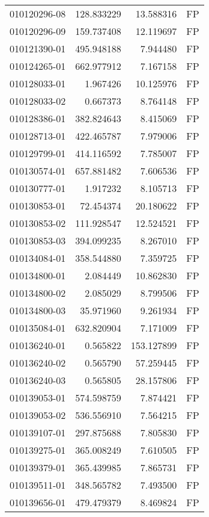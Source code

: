 \begin{tabular}{lrrl}
010120296-08 &  128.833229 &    13.588316 &   FP \\
010120296-09 &  159.737408 &    12.119697 &   FP \\
010121390-01 &  495.948188 &     7.944480 &   FP \\
010124265-01 &  662.977912 &     7.167158 &   FP \\
010128033-01 &    1.967426 &    10.125976 &   FP \\
010128033-02 &    0.667373 &     8.764148 &   FP \\
010128386-01 &  382.824643 &     8.415069 &   FP \\
010128713-01 &  422.465787 &     7.979006 &   FP \\
010129799-01 &  414.116592 &     7.785007 &   FP \\
010130574-01 &  657.881482 &     7.606536 &   FP \\
010130777-01 &    1.917232 &     8.105713 &   FP \\
010130853-01 &   72.454374 &    20.180622 &   FP \\
010130853-02 &  111.928547 &    12.524521 &   FP \\
010130853-03 &  394.099235 &     8.267010 &   FP \\
010134084-01 &  358.544880 &     7.359725 &   FP \\
010134800-01 &    2.084449 &    10.862830 &   FP \\
010134800-02 &    2.085029 &     8.799506 &   FP \\
010134800-03 &   35.971960 &     9.261934 &   FP \\
010135084-01 &  632.820904 &     7.171009 &   FP \\
010136240-01 &    0.565822 &   153.127899 &   FP \\
010136240-02 &    0.565790 &    57.259445 &   FP \\
010136240-03 &    0.565805 &    28.157806 &   FP \\
010139053-01 &  574.598759 &     7.874421 &   FP \\
010139053-02 &  536.556910 &     7.564215 &   FP \\
010139107-01 &  297.875688 &     7.805830 &   FP \\
010139275-01 &  365.008249 &     7.610505 &   FP \\
010139379-01 &  365.439985 &     7.865731 &   FP \\
010139511-01 &  348.565782 &     7.493500 &   FP \\
010139656-01 &  479.479379 &     8.469824 &   FP \\

\end{tabular}
